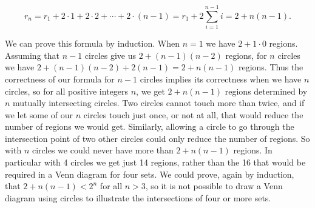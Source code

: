 \documentclass{book}
\begin{document}
\begin{activity}[]
\begin{equation*}
r_n=r_1  +2\cdot1+2\cdot2+\cdots+2\cdot(n-1)=r_1+2\sum_{i=1}^{n-1}   i=2+n(n-1). 
\end{equation*}
%
\par
\hypertarget{p-933}{}%
We can prove this formula by induction. When \(n=1\) we have \(2+1\cdot0\) regions. Assuming that \(n-1\) circles give us \(2+(n-1)(n-2)\) regions, for \(n\) circles we have \(2+(n-1)(n-2) +2(n-1)=2+n(n-1)\) regions. Thus the correctness of our formula for \(n-1\) circles implies its correctness when we have \(n\) circles, so for all positive integers \(n\), we get \(2+n(n-1)\) regions determined by \(n\) mutually intersecting circles. Two circles cannot touch more than twice, and if we let some of our \(n\) circles touch just once, or not at all, that would reduce the number of regions we would get. Similarly, allowing a circle to go through the intersection point of two other circles could only reduce the number of regions. So with \(n\) circles we could never have more than \(2+n(n-1)\) regions. In particular with 4 circles we get just 14 regions, rather than the 16 that would be required in a Venn diagram for four sets. We could prove, again by induction, that \(2+n(n-1)\lt 2^n\) for all \(n>3\), so it is not possible to draw a Venn diagram using circles to illustrate the intersections of four or more sets.%
\end{activity}
\end{document}
